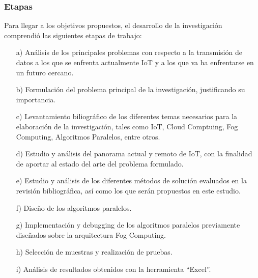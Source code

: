             \subsubsection{Etapas}
                Para llegar a los objetivos propuestos, el desarrollo de la investigación comprendió las siguientes etapas de trabajo: 
                \begin{enumerate}
                    \item[a)] Análisis de los principales problemas con respecto a la transmisión de datos a los que se enfrenta actualmente IoT y a los que va ha enfrentarse en un futuro cercano.
                    \item[b)] Formulación del problema principal de la investigación, justificando su importancia.
                    \item[c)] Levantamiento biliográfico de los diferentes temas necesarios para la elaboración de la investigación, tales como IoT, Cloud Comptuing, Fog Computing, Algoritmos Paralelos, entre otros.
                    \item[d)] Estudio y análisis del panorama actual y remoto de IoT, con la finalidad de aportar al estado del arte del problema formulado.
                    \item[e)] Estudio y análisis de los diferentes métodos de solución evaluados en la revisión bibliográfica, así como los que serán propuestos en este estudio.
                    \item[f)] Diseño de los algoritmos paralelos.
                    \item[g)] Implementación y debugging de los algoritmos paralelos previamente diseñados sobre la arquitectura Fog Computing.
                    \item[h)] Selección de muestras y realización de pruebas.
                    \item[i)] Análisis de resultados obtenidos con la herramienta ``Excel''. 
                \end{enumerate}                
